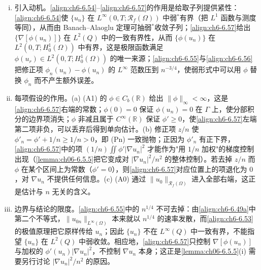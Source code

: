 \documentclass[../../main.tex]{subfiles}%
\begin{document}
\begin{remark}\label{remark:ch06-6.5.3动机}
\begin{enumerate}[(i)]
\item 引入动机。\eqref{align:ch6-6.54}--\eqref{align:ch6-6.57}的作用是给取子列提供紧性：\eqref{align:ch6-6.54}使 $\{u_n\}$ 在 $L^\infty(0,T;\mathscr{R}_f(\Omega))$ 中弱$^*$有界（把 $L^1$ 函数与测度等同），从而由 Banach--Alaoglu 定理可抽弱$^*$收敛子列；\eqref{align:ch6-6.57}给出 $\{\nabla[\phi(u_n)]\}$ 在 $L^2(Q)$ 中的一致有界性，从而 $\{\phi(u_n)\}$ 在 $L^2(0,T;H^1_0(\Omega))$ 中有界，这是极限函数满足 $\phi(u_r)\in L^2(0,T;H^1_0(\Omega))$ 的唯一来源；\eqref{align:ch6-6.55}与\eqref{align:ch6-6.56}把修正项 $\phi_n(u_n)-\phi(u_n)$ 的 $L^\infty$ 范数压到 $n^{-3/4}$，使弱形式中可以用 $\phi$ 替换 $\phi_n$ 而不产生额外误差。
\item 每项假设的作用。(a) (A1) 的 $\phi\in C_b(\mathbb{R})$ 给出 $\|\phi\|_\infty<\infty$，这是\eqref{align:ch6-6.57}右端的常数；$\phi(0)=0$ 保证 $\phi(u_n)=0$ 在 $\Gamma$ 上，使分部积分的边界项消失；$\phi$ 非减且属于 $C^\infty(\mathbb{R})$ 保证 $\phi'\geqslant0$，使\eqref{align:ch6-6.57}左端第二项非负，可以丢弃后得到单向估计。(b) 修正项 $z/n$ 使 $\phi'_n=\phi'+1/n\geqslant1/n>0$，即 (Pn) 一致抛物；正因为 $\phi'_n$ 有正下界，\eqref{align:ch6-6.57}中的项 $(1/n)\iint\phi'|\nabla u_n|^2$ 才能作为"用 $1/n$ 加权"的梯度控制出现（\cref{lemma:ch06-6.5.5}把它变成对 $|\nabla u_n|^2/n^2$ 的整体控制）。若去掉 $z/n$ 而 $\phi$ 在某个区间上为常数（$\phi'=0$），则\eqref{align:ch6-6.57}对应位置上的项退化为 $0$，对 $\nabla u_n$ 不提供任何信息。(c) (A0) 通过 $\|u_0\|_{\mathscr{R}_f(\Omega)}$ 进入全部右端，这正是估计与 $n$ 无关的含义。
\item 边界与结论的限度。\eqref{align:ch6-6.55}中的 $n^{1/4}$ 不可去掉：由\eqref{align:ch6-6.49a}中第二个不等式，$\|u_{0n}\|_{L^\infty(\Omega)}$ 本来就以 $n^{1/4}$ 的速率发散，而\eqref{align:ch6-6.53}的极值原理把它原样传给 $u_n$；因此 $\{u_n\}$ 不在 $L^\infty(Q)$ 中一致有界，不能指望 $\{u_n\}$ 在 $L^2(Q)$ 中弱收敛。相应地，\eqref{align:ch6-6.57}只控制 $\nabla[\phi(u_n)]$ 与加权的 $\phi'(u_n)|\nabla u_n|^2$，不控制 $\nabla u_n$ 本身；这正是\cref{lemma:ch06-6.5.5}(i) 需要另行讨论 $|\nabla u_n|^2/n^2$ 的原因。
\end{enumerate}
\end{remark}
\end{document}
